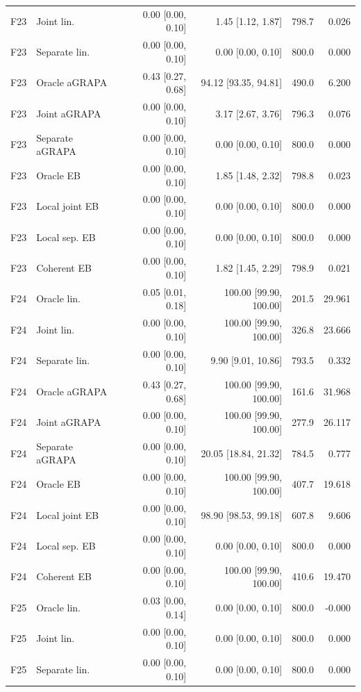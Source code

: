 \begin{longtable}{llrrrr}
F23 & Joint lin. & 0.00 [0.00, 0.10] & 1.45 [1.12, 1.87] & 798.7 & 0.026\\
F23 & Separate lin. & 0.00 [0.00, 0.10] & 0.00 [0.00, 0.10] & 800.0 & 0.000\\
F23 & Oracle aGRAPA & 0.43 [0.27, 0.68] & 94.12 [93.35, 94.81] & 490.0 & 6.200\\
F23 & Joint aGRAPA & 0.00 [0.00, 0.10] & 3.17 [2.67, 3.76] & 796.3 & 0.076\\
F23 & Separate aGRAPA & 0.00 [0.00, 0.10] & 0.00 [0.00, 0.10] & 800.0 & 0.000\\
F23 & Oracle EB & 0.00 [0.00, 0.10] & 1.85 [1.48, 2.32] & 798.8 & 0.023\\
F23 & Local joint EB & 0.00 [0.00, 0.10] & 0.00 [0.00, 0.10] & 800.0 & 0.000\\
F23 & Local sep. EB & 0.00 [0.00, 0.10] & 0.00 [0.00, 0.10] & 800.0 & 0.000\\
F23 & Coherent EB & 0.00 [0.00, 0.10] & 1.82 [1.45, 2.29] & 798.9 & 0.021\\
F24 & Oracle lin. & 0.05 [0.01, 0.18] & 100.00 [99.90, 100.00] & 201.5 & 29.961\\
F24 & Joint lin. & 0.00 [0.00, 0.10] & 100.00 [99.90, 100.00] & 326.8 & 23.666\\
F24 & Separate lin. & 0.00 [0.00, 0.10] & 9.90 [9.01, 10.86] & 793.5 & 0.332\\
F24 & Oracle aGRAPA & 0.43 [0.27, 0.68] & 100.00 [99.90, 100.00] & 161.6 & 31.968\\
F24 & Joint aGRAPA & 0.00 [0.00, 0.10] & 100.00 [99.90, 100.00] & 277.9 & 26.117\\
F24 & Separate aGRAPA & 0.00 [0.00, 0.10] & 20.05 [18.84, 21.32] & 784.5 & 0.777\\
F24 & Oracle EB & 0.00 [0.00, 0.10] & 100.00 [99.90, 100.00] & 407.7 & 19.618\\
F24 & Local joint EB & 0.00 [0.00, 0.10] & 98.90 [98.53, 99.18] & 607.8 & 9.606\\
F24 & Local sep. EB & 0.00 [0.00, 0.10] & 0.00 [0.00, 0.10] & 800.0 & 0.000\\
F24 & Coherent EB & 0.00 [0.00, 0.10] & 100.00 [99.90, 100.00] & 410.6 & 19.470\\
F25 & Oracle lin. & 0.03 [0.00, 0.14] & 0.00 [0.00, 0.10] & 800.0 & -0.000\\
F25 & Joint lin. & 0.00 [0.00, 0.10] & 0.00 [0.00, 0.10] & 800.0 & 0.000\\
F25 & Separate lin. & 0.00 [0.00, 0.10] & 0.00 [0.00, 0.10] & 800.0 & 0.000\\

\end{longtable}
